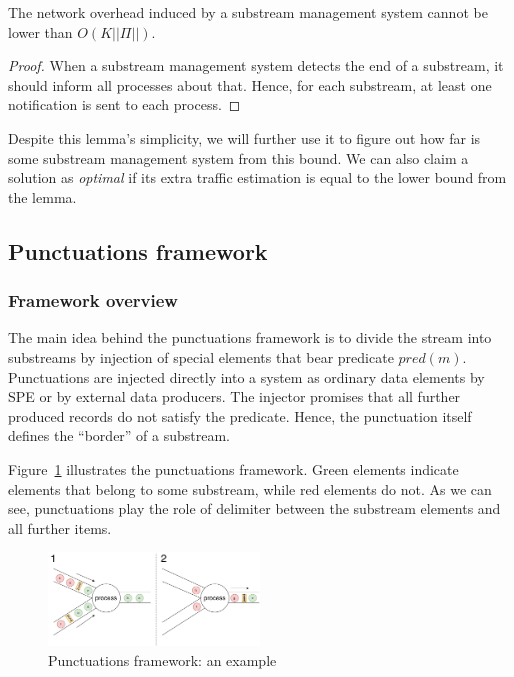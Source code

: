 \begin{lemma}
The network overhead induced by a substream management system cannot be lower than $O(K||\Pi||)$. 
\end{lemma}
\begin{proof}
When a substream management system detects the end of a substream, it should inform all processes about that. Hence, for each substream, at least one notification is sent to each process.
\end{proof}

Despite this lemma's simplicity, we will further use it to figure out how far is some substream management system from this bound. We can also claim a solution as {\em optimal} if its extra traffic estimation is equal to the lower bound from the lemma.

\subsection{Punctuations framework}

\subsubsection{Framework overview}

The main idea behind the punctuations framework is to divide the stream into substreams by injection of special elements that bear predicate $pred(m)$. Punctuations are injected directly into a system as ordinary data elements by SPE or by external data producers. The injector promises that all further produced records do not satisfy the predicate. Hence, the punctuation itself defines the ``border'' of a substream.

Figure~\ref{punctuations_scheme} illustrates the punctuations framework. Green elements indicate elements that belong to some substream, while red elements do not. As we can see, punctuations play the role of delimiter between the substream elements and all further items.

\begin{figure}[htbp]
  \centering
  \includegraphics[width=0.50\textwidth]{pics/punctuations-scheme.pdf}
  \caption{Punctuations framework: an example}
  \label{punctuations_scheme}
\end{figure}

